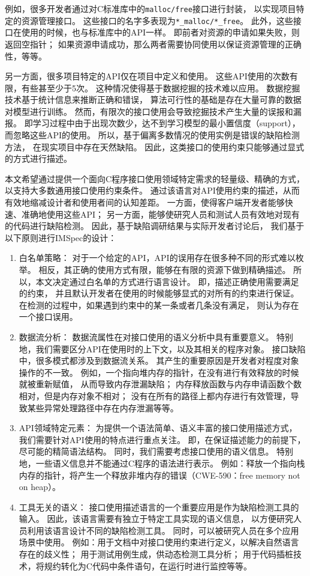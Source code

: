 例如，很多开发者通过对C标准库中的\texttt{malloc/free}接口进行封装，
以实现项目特定的资源管理接口。
这些接口的名字多表现为\texttt{*\_malloc/*\_free}。
此外，这些接口在使用的时候，也与标准库中的API一样。
即前者对资源的申请如果失败，则返回空指针；
如果资源申请成功，那么两者需要协同使用以保证资源管理的正确性，等等。

另一方面，很多项目特定的API仅在项目中定义和使用。
这些API使用的次数有限，有些甚至少于5次。
这种情况使得基于数据挖掘的技术难以应用。
数据挖掘技术基于统计信息来推断正确和错误，
算法可行性的基础是存在大量可靠的数据对模型进行训练。
然而，有限次的接口使用会导致挖掘技术产生大量的误报和漏报。
即学习过程中由于出现次数少，达不到学习模型的最小置信度（support），
而忽略这些API的使用。
所以，基于偏离多数情况的使用实例是错误的缺陷检测方法，
在现实项目中存在天然缺陷。
因此，这类接口的使用约束只能够通过显式的方式进行描述。


本文希望通过提供一个面向C程序接口使用领域特定需求的轻量级、精确的方式，
以支持大多数通用接口使用约束条件。
通过该语言对API使用约束的描述，从而有效地缩减设计者和使用者间的认知差距。
一方面，使得客户端开发者能够快速、准确地使用这些API；
另一方面，能够使研究人员和测试人员有效地对现有的代码进行缺陷检测。
因此，基于缺陷调研结果与实际开发者讨论后，
我们基于以下原则进行IMSpec的设计：
\begin{enumerate}
	\item 白名单策略：
	对于一个给定的API，API的误用存在很多种不同的形式难以枚举。
	相反，其正确的使用方式有限，能够在有限的资源下做到精确描述。
	所以，本文决定通过白名单的方式进行语言设计。
	即，描述正确使用需要满足的约束，
	并且默认开发者在使用的时候能够显式的对所有的约束进行保证。
	在检测的过程中，如果遇到约束中的某一条或者几条没有满足，
	则认为存在一个接口误用。
	
	\item 数据流分析：
	数据流属性在对接口使用的语义分析中具有重要意义。
	特别地，我们需要区分API在使用时的上下文，以及其相关的程序对象。
	接口缺陷中，很多模式都涉及到数据流关系。
	其产生的重要原因是开发者对程度对象操作的不一致。
	例如，一个指向堆内存的指针，在没有进行有效释放的时候就被重新赋值，
	从而导致内存泄漏缺陷；
	内存释放函数与内存申请函数个数相对，但是内存对象不相对；
	没有在所有的路径上都内存进行有效管理，导致某些异常处理路径中存在内存泄漏等等。
	
	\item API领域特定元素：
	为提供一个语法简单、语义丰富的接口使用描述方式，
	我们需要针对API使用的特点进行重点关注。
	即，在保证描述能力的前提下，尽可能的精简语法结构。
	同时，我们需要考虑接口使用的语义信息。
	特别地，一些语义信息并不能通过C程序的语法进行表示。
	例如：释放一个指向栈内存的指针，将产生一个释放非堆内存的错误（CWE-590：free memory not on heap）。
	
	\item 工具无关的语义：
	接口使用描述语言的一个重要应用是作为缺陷检测工具的输入。
	因此，该语言需要有独立于特定工具实现的语义信息，
	以方便研究人员利用该语言设计不同的缺陷检测工具。
	同时，可以被研究人员在多个应用场景中使用。
	例如：用于文档中对接口使用约束进行定义，以解决自然语言存在的歧义性；
	用于测试用例生成，供动态检测工具分析；
	用于代码插桩技术，将规约转化为C代码中条件语句，在运行时进行监控等等。
\end{enumerate}

